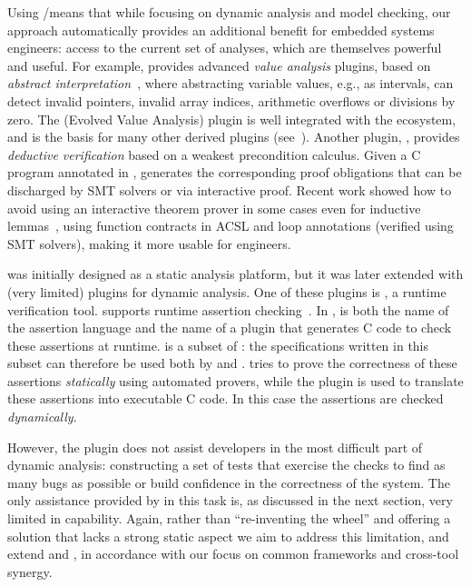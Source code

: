 Using \acsl/\framac means that while focusing on dynamic analysis and model checking, our approach automatically provides an additional benefit for embedded systems engineers: access to the current set of \framac analyses, which are themselves powerful and useful.  For example, \framac provides advanced \emph{value analysis} plugins, based on \emph{abstract interpretation}~\cite{cousot77}, where abstracting variable values, e.g., as intervals, can detect invalid pointers, invalid array indices, arithmetic overflows or divisions by zero.  The \Eva (Evolved Value Analysis) plugin is well integrated with the \framac ecosystem, 
and is the basis for many other derived plugins (see~\cite{KKP2015:FAC}).
Another \framac plugin, \Wp, provides \emph{deductive verification} based on a weakest precondition calculus.
Given a C program annotated in \acsl, \Wp generates the corresponding proof obligations that can be discharged by SMT solvers or via interactive proof.
Recent work  showed how to avoid using an interactive theorem prover in some cases even for inductive lemmas~\cite{BLK2019:NFM}, using 
function contracts in ACSL and loop annotations (verified using SMT solvers), making it more usable for engineers.

\framac was initially designed as a static analysis platform, but it was later extended with (very limited) plugins for dynamic analysis.
One of these plugins is \eacsl, a runtime verification tool.
\eacsl supports runtime assertion checking~\cite{CR2006:SEN}.
In \framac, \eacsl is both the name of the assertion language and the name of a plugin that generates C code to check these assertions at runtime.
\eacsl is a subset of \acsl: the specifications written in this subset can therefore be used both by \Wp and \eacsl.
\Wp tries to prove the correctness of these assertions {\em statically} using automated provers, while the plugin \eacsl is used to translate these assertions into executable C code.
In this case the assertions are checked {\em dynamically}.

However, the \eacsl plugin does not assist developers in the most difficult part of dynamic analysis:  constructing a set of tests that exercise the checks to find as many bugs as possible or build confidence in the correctness of the system.  The only assistance provided by \framac in this task is, as discussed in the next section, very limited in capability.  Again, rather than ``re-inventing the wheel'' and offering a solution that lacks a strong static aspect we aim to address this limitation, and extend \acsl and \eacsl, in accordance with our focus on common frameworks and cross-tool synergy. 